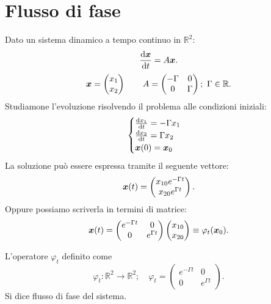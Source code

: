 \section{Flusso di fase}%
\label{sub:Flusso di fase}
Dato un sistema dinamico a tempo continuo in $\mathbb{R}^2$:
\[
    \frac{\text{d} \boldsymbol{x}}{\text{d} t} = A\boldsymbol{x}
.\] 
\[
    \boldsymbol{x} = \begin{pmatrix} x_1 \\ x_2 \end{pmatrix}  \qquad A = \begin{pmatrix} - \Gamma  & 0 \\ 0 & \Gamma \end{pmatrix}; \ \Gamma  \in \mathbb{R}
.\] 
Studiamone l'evoluzione risolvendo il problema alle condizioni iniziali:
\[
    \begin{cases}
        \frac{\text{d} x_1}{\text{d} t} = -\Gamma  x_1\\
	\frac{\text{d} x_2}{\text{d} t} = \Gamma x_2\\
	\boldsymbol{x} (0)=\boldsymbol{x}_0
    \end{cases}
\] 
La soluzione può essere espressa tramite il seguente vettore:
\[
    \boldsymbol{x} (t)= 
    \begin{pmatrix}  
	x_{10}e^{-\Gamma t}\\
	x_{20}e^{\Gamma t}
    \end{pmatrix} 
.\] 
Oppure possiamo scriverla in termini di matrice:
\[
    \boldsymbol{x} (t)=
    \begin{pmatrix} 
    e^{-\Gamma t} & 0 \\
    0 & e^{\Gamma t}
    \end{pmatrix} 
    \begin{pmatrix} 
	x_{10}\\
	x_{20}
    \end{pmatrix} 
    \equiv \varphi_t (\boldsymbol{x}_0)
.\] 
\begin{defn}
    L'operatore $\varphi_t$ definito come
    \[
        \varphi_t: \mathbb{R}^2 \to \mathbb{R}^2; \quad 
	\varphi_t = 
	\begin{pmatrix} 
	    e^{-\Gamma t} & 0 \\
	    0 & e^{\Gamma t} 
        \end{pmatrix} 
    .\] 
    Si dice flusso di fase del sistema.
\end{defn}
\noindent
